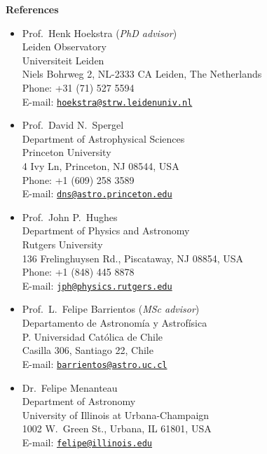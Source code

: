 \documentclass[11pt]{article}
\newcommand\email[1]{\href{mailto:#1}{\texttt{#1}}}
\begin{document}
\noindent
{\bf\Large References}
\begin{itemize}
 \item Prof.~Henk Hoekstra (\textit{PhD advisor})\\
       Leiden Observatory\\
       Universiteit Leiden\\
       Niels Bohrweg 2, NL-2333 CA Leiden, The Netherlands\\
       Phone: +31 (71) 527 5594\\
       E-mail: \email{hoekstra@strw.leidenuniv.nl}
 \item Prof.~David N.~Spergel\\
       Department of Astrophysical Sciences\\
       Princeton University\\
       4 Ivy Ln, Princeton, NJ 08544, USA\\
       Phone: +1 (609) 258 3589\\
       E-mail: \email{dns@astro.princeton.edu}
 \item Prof.~John P.~Hughes\\
       Department of Physics and Astronomy\\
       Rutgers University\\
       136 Frelinghuysen Rd., Piscataway, NJ 08854, USA\\
       Phone: +1 (848) 445 8878\\
       E-mail: \email{jph@physics.rutgers.edu}
 \item Prof.~L.~Felipe Barrientos (\textit{MSc advisor})\\
       Departamento de Astronom\'ia y Astrof\'isica\\
       P. Universidad Cat\'olica de Chile\\
       Casilla 306, Santiago 22, Chile\\
       E-mail: \email{barrientos@astro.uc.cl}
 \item Dr.~Felipe Menanteau\\
       Department of Astronomy\\
       University of Illinois at Urbana-Champaign\\
       1002 W.\ Green St., Urbana, IL 61801, USA\\
       E-mail: \email{felipe@illinois.edu}
\end{itemize}




% 
\end{document}

